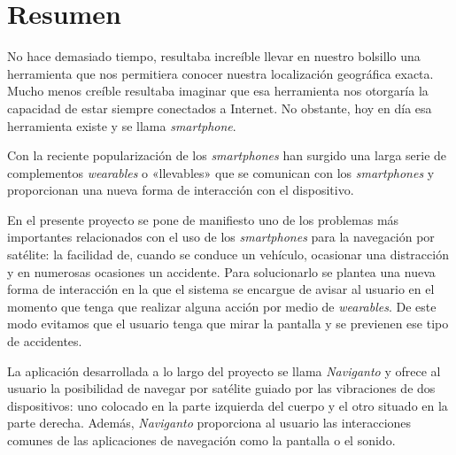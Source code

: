 \chapter{Resumen}

No hace demasiado tiempo, resultaba increíble llevar en nuestro bolsillo una herramienta que nos
permitiera conocer nuestra localización geográfica exacta. Mucho menos creíble resultaba imaginar
que esa herramienta nos otorgaría la capacidad de estar siempre conectados a Internet. No
obstante, hoy en día esa herramienta existe y se llama \emph{smartphone}.

Con la reciente popularización de los \emph{smartphones} han surgido una larga serie de complementos
\emph{wearables} o «llevables» que se comunican con los \emph{smartphones} y proporcionan una nueva
forma de interacción con el dispositivo.

En el presente proyecto se pone de manifiesto uno de los problemas más importantes relacionados con
el uso de los \emph{smartphones} para la navegación por satélite: la facilidad de, cuando se conduce
un vehículo, ocasionar una distracción y en numerosas ocasiones un accidente. Para solucionarlo se
plantea una nueva forma de interacción en la que el sistema se encargue de avisar al usuario en el
momento que tenga que realizar alguna acción por medio de \emph{wearables}. De este modo evitamos
que el usuario tenga que mirar la pantalla y se previenen ese tipo de accidentes.

La aplicación desarrollada a lo largo del proyecto se llama \emph{Naviganto} y ofrece al usuario la
posibilidad de navegar por satélite guiado por las vibraciones de dos dispositivos: uno colocado en
la parte izquierda del cuerpo y el otro situado en la parte derecha. Además, \emph{Naviganto}
proporciona al usuario las interacciones comunes de las aplicaciones de navegación como la pantalla
o el sonido.

